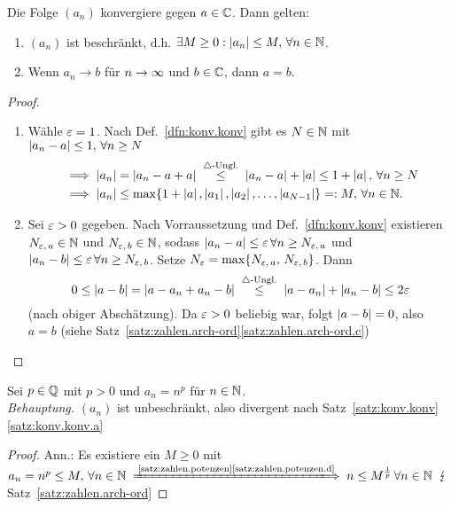 \documentclass[12pt]{scrreprt}
\begin{document}
\begin{satz}
  \label{satz:konv.konv}
  Die Folge $(a_n)$ konvergiere gegen $a\in\mathbb{C}$. Dann gelten:
  \begin{enumerate}
  \item $(a_n)$ ist beschränkt, d.h. $\exists M\ge0: \left\lvert a_n\right\lvert\le M,
    \,\forall n\in\mathbb{N}$. \label{satz:konv.konv.a}
  \item Wenn $a_n \to b$ für $n\rightarrow\infty$ und $b\in\mathbb{C}$, dann
    $a=b$. \label{satz:konv.konv.b}
  \end{enumerate}
\end{satz}
\begin{proof}
  \begin{enumerate}
  \item Wähle $\varepsilon=1$. Nach Def.~\ref{dfn:konv.konv} gibt es $N\in\mathbb{N}$
    mit $\left\lvert a_n-a\right\lvert\le1,\,\forall n\ge N$
    \begin{align*}
      &\folgt \abs{a_n}=\abs{a_n-a+a} \nach{\le}{$\triangle$-Ungl.}
      \abs{a_n-a}+\abs{a} \le 1+\abs{a},\,\forall n\ge N\\
      &\folgt \abs{a_n} \le \max
      \{1+\abs{a},\abs{a_1},\abs{a_2},\dotsc,\abs{a_{N-1}}\} =:
      M,\,\forall \nat{n}.
    \end{align*}
  \item Sei $\varepsilon>0$ gegeben. Nach Vorraussetzung und
    Def.~\ref{dfn:konv.konv} existieren $N_{\varepsilon,\,a}\in\mathbb{N}$ und
    $N_{\varepsilon,\,b}\in\mathbb{N}$, sodass $\left\lvert a_n-a\right\lvert\le\varepsilon\,\forall n\ge
    N_{\varepsilon,\,a}$ und $\left\lvert a_n-b\right\lvert\le\varepsilon\,\forall n\ge
    N_{\varepsilon,\,b}$. Setze $N_\varepsilon=\max
    \{N_{\varepsilon,\,a},\,N_{\varepsilon,\,b}\}$. Dann
    \[0\le\abs{a-b}=\abs{a-a_n+a_n-b} \nach{\le}{$\triangle$-Ungl.}
    \abs{a-a_n}+\abs{a_n-b}\le2\ep\]
    (nach obiger Abschätzung). Da $\varepsilon>0$ beliebig war, folgt
    $\left\lvert a-b\right\lvert=0$, also $a=b$ (siehe
    Satz~\ref{satz:zahlen.arch-ord}\ref{satz:zahlen.arch-ord.c})
  \end{enumerate}
\end{proof}

\begin{bsp}
  \label{bsp:konv.konv.a}
  Sei $p\in\mathbb{Q}$ mit $p>0$ und $a_n=n^p$ für $n\in\mathbb{N}$.\\
  \emph{Behauptung.} $(a_n)$ ist unbeschränkt, also divergent nach
  Satz~\ref{satz:konv.konv}\ref{satz:konv.konv.a}
  \begin{proof} Ann.: Es existiere ein $M\ge0$ mit $a_n=n^p\le
    M,\,\forall \nat{n}
    \folgtnach{\ref{satz:zahlen.potenzen}\ref{satz:zahlen.potenzen.d}}
    n\le M^{\frac1p}\,\forall \nat{n}$ \folgt $\lightning$
    Satz~\ref{satz:zahlen.arch-ord} \end{proof}
\end{bsp}
\end{document}
